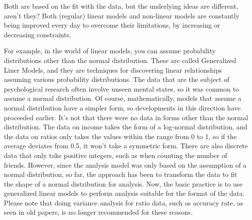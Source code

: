 \documentclass{ltjsbook}
\begin{document}
Both are based on the fit with the data, but the underlying ideas are different, aren't they? Both (regular) linear models and non-linear models are constantly being improved every day to overcome their limitations, by increasing or decreasing constraints.

For example, in the world of linear models, you can assume probability distributions other than the normal distribution. These are called Generalized Liner Models, and they are techniques for discovering linear relationships assuming various probability distributions. The data that are the subject of psychological research often involve unseen mental states, so it was common to assume a normal distribution. Of course, mathematically, models that assume a normal distribution have a simpler form, so developments in this direction have proceeded earlier. It's not that there were no data in forms other than the normal distribution. The data on income takes the form of a log-normal distribution, and the data on ratios only takes the values within the range from 0 to 1, so if the average deviates from 0.5, it won't take a symmetric form. There are also discrete data that only take positive integers, such as when counting the number of friends. However, since the analysis model was only based on the assumption of a normal distribution, so far, the approach has been to transform the data to fit the shape of a normal distribution for analysis. Now, the basic practice is to use generalized linear models to perform analysis suitable for the format of the data. Please note that doing variance analysis for ratio data, such as accuracy rate, as seen in old papers, is no longer recommended for these reasons.
\end{document}
